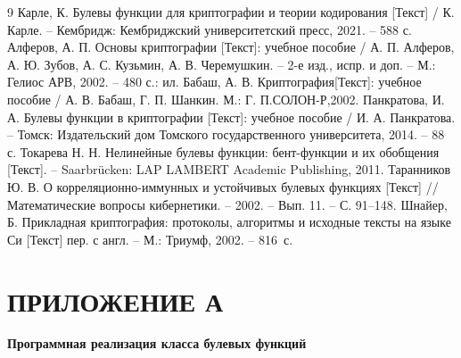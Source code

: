 \begin{thebibliography}{9}
\renewcommand{\bibnumfmt}[1]{#1.}  %
Карле, К. Булевы функции для криптографии и теории кодирования [Текст] / К. Карле. – Кембридж: Кембриджский университетский пресс, 2021. – 588 с.
Алферов, А. П. Основы криптографии [Текст]: учебное пособие / А. П. Алферов, А. Ю. Зубов, А. С. Кузьмин, А. В. Черемушкин. – 2-е изд., испр. и доп. – М.: Гелиос АРВ, 2002. – 480 с.: ил.
Бабаш, А. В. Криптография[Текст]: учебное пособие / А. В. Бабаш, Г. П. Шанкин. М.:  Г. П.СОЛОН-Р,2002.
Панкратова, И. А. Булевы функции в криптографии [Текст]: учебное пособие / И. А. Панкратова. – Томск: Издательский дом Томского государственного университета, 2014. – 88 с.
Токарева Н. Н. Нелинейные булевы функции: бент-функции и их обобщения [Текст]. – Saarbrücken: LAP LAMBERT Academic Publishing, 2011.
Таранников Ю. В. О корреляционно-иммунных и устойчивых булевых функциях [Текст] // Математические вопросы кибернетики. – 2002. – Вып. 11. – С. 91–148.
Шнайер, Б. Прикладная криптография: протоколы, алгоритмы и исходные тексты на языке Си [Текст] пер. с англ. – М.: Триумф, 2002. – 816~с.

\end{thebibliography}
\newpage
\section*{ПРИЛОЖЕНИЕ А}
\begin{center}
    \textbf{Программная реализация класса булевых функций}
\end{center}
